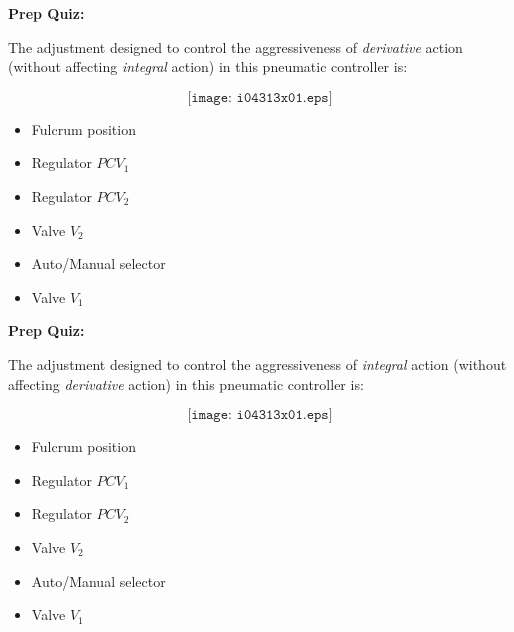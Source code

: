 \vfil \eject

\noindent
{\bf Prep Quiz:}

The adjustment designed to control the aggressiveness of {\it derivative} action (without affecting {\it integral} action) in this pneumatic controller is:

$$\texttt{[image: i04313x01.eps]}$$

\begin{itemize}
\item{} Fulcrum position
\vskip 10pt
\item{} Regulator $PCV_1$
\vskip 10pt
\item{} Regulator $PCV_2$ 
\vskip 10pt
\item{} Valve $V_2$
\vskip 10pt
\item{} Auto/Manual selector
\vskip 10pt
\item{} Valve $V_1$
\end{itemize}



\vfil \eject

\noindent
{\bf Prep Quiz:}

The adjustment designed to control the aggressiveness of {\it integral} action (without affecting {\it derivative} action) in this pneumatic controller is:

$$\texttt{[image: i04313x01.eps]}$$

\begin{itemize}
\item{} Fulcrum position
\vskip 10pt
\item{} Regulator $PCV_1$
\vskip 10pt
\item{} Regulator $PCV_2$ 
\vskip 10pt
\item{} Valve $V_2$
\vskip 10pt
\item{} Auto/Manual selector
\vskip 10pt
\item{} Valve $V_1$
\end{itemize}





